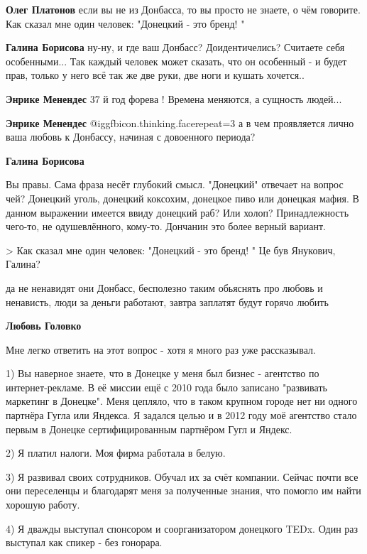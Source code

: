 \begin{itemize}
\begin{itemize}
\textbf{Олег Платонов} если вы не из Донбасса, то вы просто не знаете, о чём говорите. Как сказал мне один человек: "Донецкий - это бренд! "

\textbf{Галина Борисова} ну-ну, и где ваш Донбасс? Доидентичелись? Считаете себя особенными... Так каждый человек может сказать, что он особенный - и будет прав, только у него всё так же две руки, две ноги и кушать хочется..

\textbf{Энрике Менендес} 37 й год форева ! Времена меняются, а сущность людей...

\textbf{Энрике Менендес}  @igg{fbicon.thinking.face}{repeat=3}  а в чем проявляется лично ваша любовь к Донбассу, начиная с довоенного периода?

\textbf{Галина Борисова} 

Вы правы. Сама фраза несёт глубокий смысл. "Донецкий" отвечает на вопрос чей?
Донецкий уголь, донецкий коксохим, донецкое пиво или донецкая мафия. В данном
выражении имеется ввиду донецкий раб? Или холоп? Принадлежность чего-то, не
одушевлённого, кому-то. Дончанин это более верный вариант.


> Как сказал мне один человек: "Донецкий - это бренд! "
Це був Янукович, Галина?


да не ненавидят они Донбасс, бесполезно таким обьяснять про любовь и ненависть,
люди за деньги работают, завтра заплатят будут горячо любить

\textbf{Любовь Головко} 

Мне легко ответить на этот вопрос - хотя я много раз уже рассказывал.

1) Вы наверное знаете, что в Донецке у меня был бизнес - агентство по
интернет-рекламе. В её миссии ещё с 2010 года было записано "развивать
маркетинг в Донецке". Меня цепляло, что в таком крупном городе нет ни одного
партнёра Гугла или Яндекса. Я задался целью и в 2012 году моё агентство стало
первым в Донецке сертифицированным партнёром Гугл и Яндекс.

2) Я платил налоги. Моя фирма работала в белую.

3) Я развивал своих сотрудников. Обучал их за счёт компании. Сейчас почти все они переселенцы и благодарят меня за полученные знания, что помогло им найти хорошую работу.

4) Я дважды выступал спонсором и соорганизатором донецкого TEDx. Один раз выступал как спикер - без гонорара.


\end{itemize}
\end{itemize}
